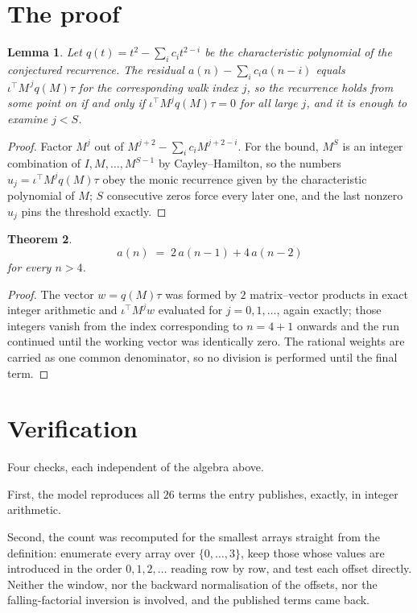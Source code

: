 \documentclass[11pt,a4paper]{article}
\theoremstyle{plain}
\newtheorem{theorem}{Theorem}
\newtheorem{lemma}[theorem]{Lemma}
\theoremstyle{definition}
\begin{document}
\section{The proof}

\begin{lemma}\label{lem:crit}
Let $q(t)=t^{2}-\sum_i c_it^{2-i}$ be the characteristic polynomial of the
conjectured recurrence. The residual $a(n)-\sum_ic_ia(n-i)$ equals
$\iota^{\!\top}M^{\,j}q(M)\tau$ for the corresponding walk index $j$, so the recurrence
holds from some point on if and only if $\iota^{\!\top}M^{j}q(M)\tau=0$ for all large $j$,
and it is enough to examine $j<S$.
\end{lemma}

\begin{proof}
Factor $M^{j}$ out of $M^{j+2}-\sum_ic_iM^{j+2-i}$. For the bound, $M^{S}$
is an integer combination of $I,M,\dots,M^{S-1}$ by Cayley--Hamilton, so the numbers
$u_j=\iota^{\!\top}M^{j}q(M)\tau$ obey the monic recurrence given by the characteristic
polynomial of $M$; $S$ consecutive zeros force every later one, and the last nonzero $u_j$
pins the threshold exactly.
\end{proof}

\begin{theorem}
\[
a(n)\;=\;2\,a(n-1) + 4\,a(n-2)
\]
for every $n>4$.
\end{theorem}

\begin{proof}
The vector $w=q(M)\tau$ was formed by $2$ matrix--vector products in exact integer
arithmetic and $\iota^{\!\top}M^{j}w$ evaluated for $j=0,1,\dots$, again exactly; those
integers vanish from the index corresponding to $n=4+1$ onwards and the run continued
until the working vector was identically zero. The rational weights are carried as one common
denominator, so no division is performed until the final term.
\end{proof}

\section{Verification}

Four checks, each independent of the algebra above.

First, the model reproduces all $26$ terms the entry publishes, exactly, in integer
arithmetic.

Second, the count was recomputed for the smallest arrays straight from the definition:
enumerate every array over $\{0,\dots,3\}$, keep those whose values are introduced in the
order $0,1,2,\dots$ reading row by row, and test each offset directly. Neither the window, nor
the backward normalisation of the offsets, nor the falling-factorial inversion is involved, and
the published terms came back.
\end{document}

